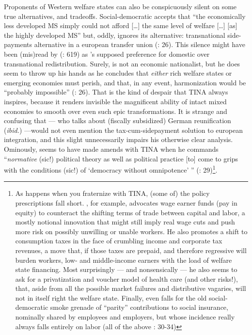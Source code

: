 \documentclass[11pt,a4paper,oneside,openright]{article}
\begin{document}
Proponents of Western welfare states can also be conspicuously silent on some true alternatives, and tradeoffs. 
Social-democratic \cite{Scharpf1997} accepts that ``the economically less developed \gls{MS} simply could not afford [\ldots] the same level of welfare [\ldots] [as] the highly developed \gls{MS}'' but, oddly, ignores its alternative: 
transnational side-payments alternative in a european transfer union (\citeyear{Scharpf1997}: 26). 
This silence might have been (mis)read by \citeauthor{Moravcsik-2002-aa} (\citeyear{Moravcsik-2002-aa}: 
619) as \citeauthor{Scharpf1997}'s supposed preference for domestic over transnational redistribution. 
Surely, \citeauthor{Scharpf1997} is not an economic nationalist, but he does seem to throw up his hands as he concludes that \emph{either} rich welfare states or emerging economies must perish, and that, in any event, harmonization would be ``probably impossible'' (\citeyear{Scharpf1997}: 26). 
That is the kind of despair that TINA always inspires, because it renders invisible the magnificent ability of intact mixed economies to smooth over even such epic transformations. 
It is strange and confusing that \citeauthor{Scharpf1997} --- who talks about (fiscally subsidized) German reunification (\emph{ibid.}) ---would not even mention the tax-cum-sidepayment solution to european integration, and this slight unnecessarily impairs his otherwise clear analysis. 
Ominously, \citeauthor{Scharpf1997} seems to have made amends with TINA when he commands ``\emph{normative} (sic!) political theory as well as political practice [to] come to grips with the conditions (sic!) of `democracy without omnipotence' '' (\citeyear{Scharpf1997}: 29)\footnote{
	As happens when you fraternize with TINA, (some of) the policy prescriptions fall short. 
\citeauthor{Scharpf1997}, for example, advocates wage earner funds (pay in equity) to counteract the shifting terms of trade between capital and labor, a mostly notional innovation that might still imply real wage cuts and push more risk on possibly unwilling or unable workers. 
He also promotes a shift to consumption taxes in the face of crumbling income and corporate tax revenues, a move that, if those taxes are prepaid, and therefore regressive will burden workers, low- and middle-income earners with the load of welfare state financing. 
Most surprisingly --- and nonsensically --- he also seems to ask for a privatization and voucher model of health care (and other risks!), that, aside from all the possible market failures and distributive vagaries, will not in itself right the welfare state. 
Finally, \citeauthor{Scharpf1997} even falls for the old social-democratic smoke grenade of ``parity'' contributions to social insurance, nominally shared by employees and employers, but whose incidence really always falls entirely on labor (all of the above \citeyear{Scharpf1997}: 30-34)}.
\end{document}
